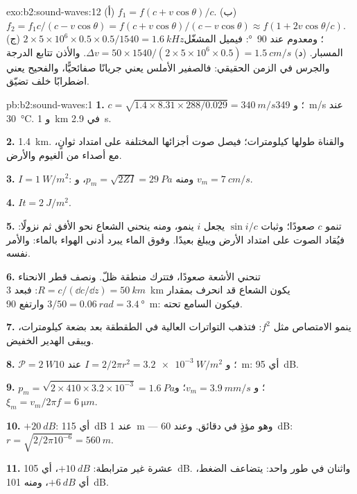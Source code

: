 \begin{solution}{exo:b2:sound-waves:12}
(أ) $f_1 = f(c + v\cos\theta)/c$. (ب) $f_2 = f_1c/(c - v\cos\theta) = f(c + v\cos\theta)
/(c - v\cos\theta) \approx f(1 + 2v\cos\theta/c)$. (ج) $2 \times 5 \times 10^6 \times 0.5 \times 0.5/1540
= \qty{1.6}{kHz}$؛ ومعدوم عند \qty{90}{\degree}: فيميل المشغّل المسبار. (د) $\Delta v = 50 \times 1540/
(2 \times 5 \times 10^6 \times 0.5) = \qty{1.5}{cm/s}$. والأذن تتابع الدرجة والجرس في
الزمن الحقيقي: فالصفير الأملس يعني جريانًا صفائحيًّا، والفحيح يعني اضطرابًا
خلف تضيّق.
\end{solution}

\begin{solution}{pb:b2:sound-waves:1}
\textbf{1.} $c = \sqrt{1.4 \times 8.31 \times 288/0.029} = \qty{340}{m/s}$؛ و \qty{349}{m/s}
عند \qty{30}{\degreeCelsius}. و \qty{1}{km} في \qty{2.9}{s}.

\textbf{2.} \qty{1.4}{km}. والقناة طولها كيلومترات؛ فيصل صوت
أجزائها المختلفة على امتداد ثوانٍ، مع أصداء من الغيوم
والأرض.

\textbf{3.} $I = \qty{1}{W/m^2}$: ومنه $p_m = \sqrt{2ZI} = \qty{29}{Pa}$، و $v_m = \qty{7}{cm/s}$.

\textbf{4.} $It = \qty{2}{J/m^2}$.

\textbf{5.} تنمو $c$ صعودًا؛ وثبات $\sin i/c$ يجعل $i$ ينمو، ومنه ينحني
الشعاع نحو الأفق ثم نزولًا: فيُقاد الصوت
على امتداد الأرض ويبلغ بعيدًا. وفوق الماء يبرد أدنى الهواء
بالماء: والأمر نفسه.

\textbf{6.} تنحني الأشعة صعودًا، فتترك منطقة ظلّ. ونصف قطر
الانحناء $R = c/(\dd c/\dd z) = \qty{50}{km}$: فبعد \qty{3}{km} يكون الشعاع قد
انحرف بمقدار $3/50 = \qty{0.06}{rad} = \qty{3.4}{\degree}$ وارتفع \qty{90}{m}: فيكون
السامع تحته.

\textbf{7.} ينمو الامتصاص مثل $f^2$: فتذهب التواترات العالية في
الطقطقة بعد بضعة كيلومترات، ويبقى الهدير الخفيض.

\textbf{8.} $\mathcal P = \qty{2}{W}$؛ و $I = 2/2\pi r^2 = \qty{3.2e-3}{W/m^2}$ عند \qty{10}{m}:
أي \qty{95}{dB}.

\textbf{9.} $p_m = \sqrt{2 \times 410 \times 3.2 \times 10^{-3}} = \qty{1.6}{Pa}$؛ و $v_m = \qty{3.9}{mm/s}$؛
و $\xi_m = v_m/2\pi f = \qty{6}{\micro m}$.

\textbf{10.} $+\qty{20}{dB}$: أي \qty{115}{dB} عند \qty{1}{m} --- وهو مؤذٍ في
دقائق. وعند \qty{60}{dB}: $r = \sqrt{2/2\pi10^{-6}} = \qty{560}{m}$.

\textbf{11.} عشرة غير مترابطة: $+\qty{10}{dB}$، أي \qty{105}{dB}. واثنان في طور واحد:
يتضاعف الضغط، أي $+\qty{6}{dB}$، ومنه \qty{101}{dB}.


\end{solution}
